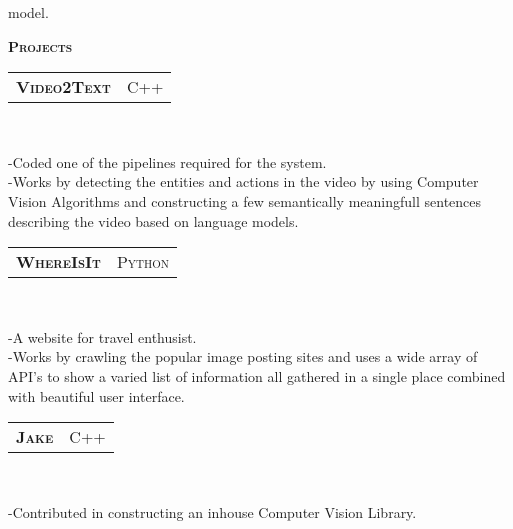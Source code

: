 \documentclass[10pt,a4paper,oneside]{article}
\begin{document}
\begin{minipage}[t]{0.63\textwidth}
\begin{adjustwidth}{7pt}{0pt}
{            model.}\\
        \end{adjustwidth}
        \textcolor{light-gray}{\textbf{\large P\textsc{rojects}}}
        \vspace{10pt}\\
        \begin{tabular}{c|c}
            \textbf{\normalsize V\textsc{ideo}2T\textsc{ext}}
            &\textmd{\normalsize C\textsc{++}}
        \end{tabular}\\
        \vspace{-4mm}
        \begin{adjustwidth}{7pt}{0pt}
            {\footnotesize -Coded one of the pipelines required
            for the system.\\
            -Works by detecting the entities and actions in the
            video by using Computer Vision Algorithms and constructing a few
            semantically meaningfull sentences describing the video
            based on language models.}\\
        \end{adjustwidth}
        \begin{tabular}{c|c}
            \textbf{\normalsize W\textsc{here}I\textsc{s}I\textsc{t}}
            &\textmd{\normalsize P\textsc{ython}}
        \end{tabular}\\
         \vspace{-4mm}
        \begin{adjustwidth}{7pt}{0pt}
            {\footnotesize -A website for travel
            enthusist.\\
            -Works by crawling the popular image posting sites and
            uses a wide array of API's to show a varied list of
            information all gathered in a single place combined with
            beautiful user interface. }\\
        \end{adjustwidth}
        \begin{tabular}{c|c}
            \textbf{\normalsize J\textsc{ake}}
            &\textmd{\normalsize C\textsc{++}}
        \end{tabular}\\
         \vspace{-4mm}
        \begin{adjustwidth}{7pt}{0pt}
            {\footnotesize -Contributed in constructing an inhouse
            Computer Vision Library.\\
}
\end{adjustwidth}
\end{minipage}
\end{document}
